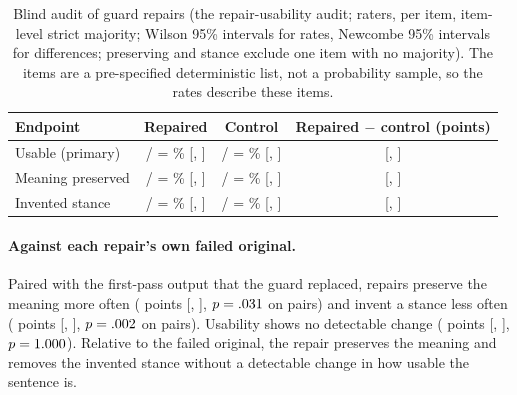 \begin{table}[t]
\caption{Blind audit of guard repairs (the repair-usability audit; \jmpOneSevenRaters{} raters, \jmpOneSevenPerItem{} per item, item-level strict majority; Wilson 95\% intervals for rates, Newcombe 95\% intervals for differences; preserving and stance exclude one item with no majority). The items are a pre-specified deterministic list, not a probability sample, so the rates describe these items.}\label{tab:p17}
\small
\begin{tabular}{lccc}
\toprule
Endpoint & Repaired & Control & Repaired $-$ control (points) \\
\midrule
Usable (primary) & \jmpOneSevenRepUsableK{}/\jmpOneSevenRepUsableN{} = \jmpOneSevenRepUsable{}\% [\jmpOneSevenRepUsableLo{}, \jmpOneSevenRepUsableHi{}] & \jmpOneSevenCtlUsableK{}/\jmpOneSevenCtlUsableN{} = \jmpOneSevenCtlUsable{}\% [\jmpOneSevenCtlUsableLo{}, \jmpOneSevenCtlUsableHi{}] & \jmpOneSevenDiffUsable{} [\jmpOneSevenDiffUsableLo{}, \jmpOneSevenDiffUsableHi{}] \\
Meaning preserved & \jmpOneSevenRepPresK{}/\jmpOneSevenRepPresN{} = \jmpOneSevenRepPres{}\% [\jmpOneSevenRepPresLo{}, \jmpOneSevenRepPresHi{}] & \jmpOneSevenCtlPresK{}/\jmpOneSevenCtlPresN{} = \jmpOneSevenCtlPres{}\% [\jmpOneSevenCtlPresLo{}, \jmpOneSevenCtlPresHi{}] & \jmpOneSevenDiffPres{} [\jmpOneSevenDiffPresLo{}, \jmpOneSevenDiffPresHi{}] \\
Invented stance & \jmpOneSevenRepStanceK{}/\jmpOneSevenRepStanceN{} = \jmpOneSevenRepStance{}\% [\jmpOneSevenRepStanceLo{}, \jmpOneSevenRepStanceHi{}] & \jmpOneSevenCtlStanceK{}/\jmpOneSevenCtlStanceN{} = \jmpOneSevenCtlStance{}\% [\jmpOneSevenCtlStanceLo{}, \jmpOneSevenCtlStanceHi{}] & \jmpOneSevenDiffStance{} [\jmpOneSevenDiffStanceLo{}, \jmpOneSevenDiffStanceHi{}] \\
\bottomrule
\end{tabular}
\end{table}

\paragraph{Against each repair's own failed original.}
Paired with the first-pass output that the guard replaced, repairs preserve the meaning more often (\jmpOneSevenOrigPres{} points [\jmpOneSevenOrigPresLo{}, \jmpOneSevenOrigPresHi{}], $p=.031{}$ on \jmpOneSevenOrigPresPairs{} pairs) and invent a stance less often (\jmpOneSevenOrigStance{} points [\jmpOneSevenOrigStanceLo{}, \jmpOneSevenOrigStanceHi{}], $p=.002{}$ on \jmpOneSevenOrigStancePairs{} pairs). Usability shows no detectable change (\jmpOneSevenOrigUsable{} points [\jmpOneSevenOrigUsableLo{}, \jmpOneSevenOrigUsableHi{}], $p=1.000{}$). Relative to the failed original, the repair preserves the meaning and removes the invented stance without a detectable change in how usable the sentence is.

